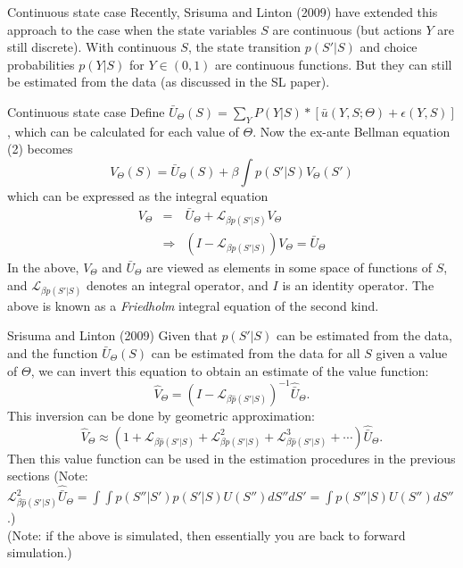 \begin{frame}{Continuous state case}
Recently, Srisuma and Linton (2009) have extended this approach to the case when the state variables $S$ are continuous (but actions $Y$ are still discrete). With continuous $S$, the state transition $p(S'|S)$ and choice probabilities $p(Y|S)$ for $Y \in (0,1)$ are continuous functions. But they can still be estimated from the data (as discussed in the SL paper). \\
\end{frame}

\begin{frame}{Continuous state case}
Define $\bar U_\Theta (S) = \sum_Y P(Y|S) * [ \bar u (Y,S;\Theta) + \epsilon(Y,S)]$, which can be calculated for each value of $\Theta$. Now the ex-ante Bellman equation (2) becomes
\begin{equation*}
V_\Theta (S) = \bar U_\Theta (S) + \beta \int p(S'|S) V_\Theta(S')
\end{equation*}
which can be expressed as the integral equation
\begin{eqnarray*}
V_\Theta &=& \bar U_\Theta + \mathcal{L}_{\beta p (S'|S)} V_\Theta \\
&\Rightarrow& (I - \mathcal{L}_{\beta p (S'|S)})V_\Theta = \bar U_\Theta
\end{eqnarray*}
In the above, $V_\Theta$ and $\bar U_\Theta$ are viewed as elements in some space of functions of $S$, and $\mathcal{L}_{\beta p (S'|S)}$ denotes an integral operator, and $I$ is an identity operator. The above is known as a \emph{Friedholm} integral equation of the second kind.
\end{frame}


\begin{frame}{Srisuma and Linton (2009)}
Given that $p(S'|S)$ can be estimated from the data, and the function $\bar U_\Theta (S)$ can be estimated from the data for all $S$ given a value of $\Theta$, we can invert this equation to obtain an estimate of the value function:
\begin{equation*}
\hat V_\Theta = (I - \mathcal{L}_{\beta \hat p (S'|S)})^{-1} \hat{\bar U}_{\Theta}.
\end{equation*}
This inversion can be done by geometric approximation:
\begin{equation*}
\hat V_\Theta \approx (1 +  \mathcal{L}_{\beta \hat p (S'|S)} + \mathcal{L}^2_{\beta \hat p (S'|S)} + \mathcal{L}^3_{\beta \hat p (S'|S)} + \cdots ) \hat{\bar U}_{\Theta}.
\end{equation*}
Then this value function can be used in the estimation procedures in the previous sections
 (Note: $\mathcal{L}^2_{\beta \hat p (S'|S)}\hat{\bar U}_{\Theta} = \int \int p(S''|S') p(S'|S) U(S'')dS''dS' = \int p(S''|S) U(S'') dS''$.)\\ 
 \vspace{0.5cm}
(Note: if the above is simulated, then essentially you are back to forward simulation.)
\end{frame}

